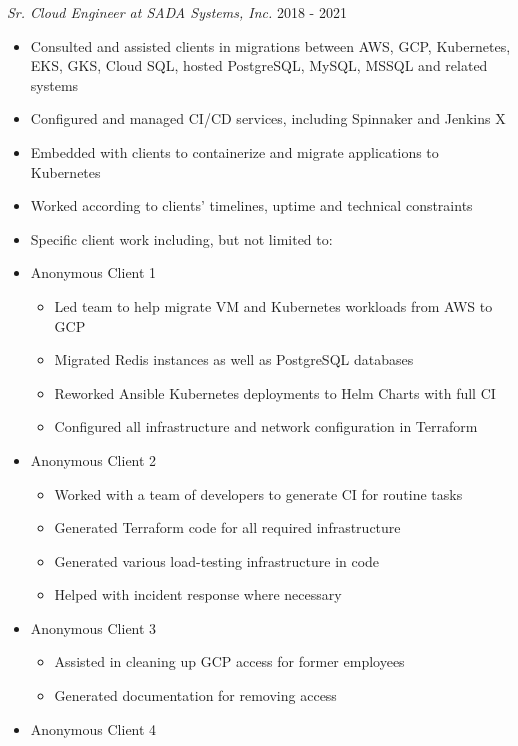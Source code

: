\documentclass[line]{docs/resume/res}
\begin{document}
\begin{resume}
\begin{itemize}
  {\sl Sr. Cloud Engineer at SADA Systems, Inc.} \hfill 2018 - 2021
  \begin{itemize} \itemsep -2pt
    \item Consulted and assisted clients in migrations between AWS, GCP, Kubernetes, \\
      EKS, GKS, Cloud SQL, hosted PostgreSQL, MySQL, MSSQL and related systems
    \item Configured and managed CI/CD services, including Spinnaker and Jenkins X
    \item Embedded with clients to containerize and migrate applications to Kubernetes
    \item Worked according to clients' timelines, uptime and technical constraints
    \item Specific client work including, but not limited to:
    \item Anonymous Client 1
    \begin{itemize} \itemsep -2pt
      \item Led team to help migrate VM and Kubernetes workloads from AWS to GCP
      \item Migrated Redis instances as well as PostgreSQL databases
      \item Reworked Ansible Kubernetes deployments to Helm Charts with full CI
      \item Configured all infrastructure and network configuration in Terraform
    \end{itemize}
    \item Anonymous Client 2
    \begin{itemize} \itemsep -2pt
      \item Worked with a team of developers to generate CI for routine tasks
      \item Generated Terraform code for all required infrastructure
      \item Generated various load-testing infrastructure in code
      \item Helped with incident response where necessary
    \end{itemize}
    \item Anonymous Client 3
    \begin{itemize} \itemsep -2pt
      \item Assisted in cleaning up GCP access for former employees
      \item Generated documentation for removing access
    \end{itemize}
    \item Anonymous Client 4

\end{itemize}
\end{itemize}
\end{resume}
\end{document}
